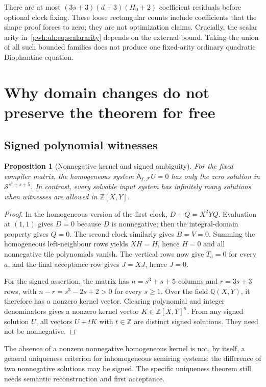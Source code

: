 \documentclass[11pt,letterpaper]{article}
\numberwithin{equation}{section}
\newtheorem{proposition}[theorem]{Proposition}
\theoremstyle{definition}
\newcommand{\Z}{\mathbb Z}
\newcommand{\F}{\mathcal F}
\newcommand{\Qfield}{\mathbb Q}
\newcommand{\Sring}{\mathcal S}
\begin{document}
There are at most $(3s+3)(d+3)(H_0+2)$ coefficient residuals before optional
clock fixing. These loose rectangular counts include coefficients that
the shape proof forces to zero; they are not optimization claims.
Crucially, the scalar arity in~\eqref{pwh:uh:eq:scalararity} depends on the
external bound. Taking the union of all such bounded families does not
produce one fixed-arity ordinary quadratic Diophantine equation.

\section{Why domain changes do not preserve the theorem for free}
\label{pwh:uh:sec:barriers}

\subsection{Signed polynomial witnesses}

\begin{proposition}[Nonnegative kernel and signed ambiguity]
\label{pwh:uh:prop:sign}
For the fixed compiler matrix, the homogeneous system
$\mathsf A_{f,\F}U=0$ has only the zero solution in
$\Sring^{s^3+s+5}$. In contrast, every solvable input system has infinitely
many solutions when witnesses are allowed in $\Z[X,Y]$.
\end{proposition}

\begin{proof}
In the homogeneous version of the first clock,
$D+Q=X^2YQ$. Evaluation at $(1,1)$ gives $D=0$ because $D$ is nonnegative;
then the integral-domain property gives $Q=0$. The second clock similarly
gives $B=V=0$. Summing the homogeneous left-neighbour rows yields
$XH=H$, hence $H=0$ and all nonnegative tile polynomials vanish. The
vertical rows now give $T_a=0$ for every $a$, and the final acceptance row
gives $J=XJ$, hence $J=0$.

For the signed assertion, the matrix has $n=s^3+s+5$ columns and
$r=3s+3$ rows, with
$n-r=s^3-2s+2>0$ for every $s\ge1$. Over the field $\Qfield(X,Y)$,
it therefore has a nonzero kernel vector. Clearing polynomial and integer
denominators gives a nonzero kernel vector $K\in\Z[X,Y]^n$. From any
signed solution $U$, all vectors $U+tK$ with $t\in\Z$ are distinct signed
solutions. They need not be nonnegative.
\end{proof}

The absence of a nonzero nonnegative homogeneous kernel is not, by itself,
a general uniqueness criterion for inhomogeneous semiring systems: the
difference of two nonnegative solutions may be signed. The specific
uniqueness theorem still needs semantic reconstruction and first
acceptance.
\end{document}

